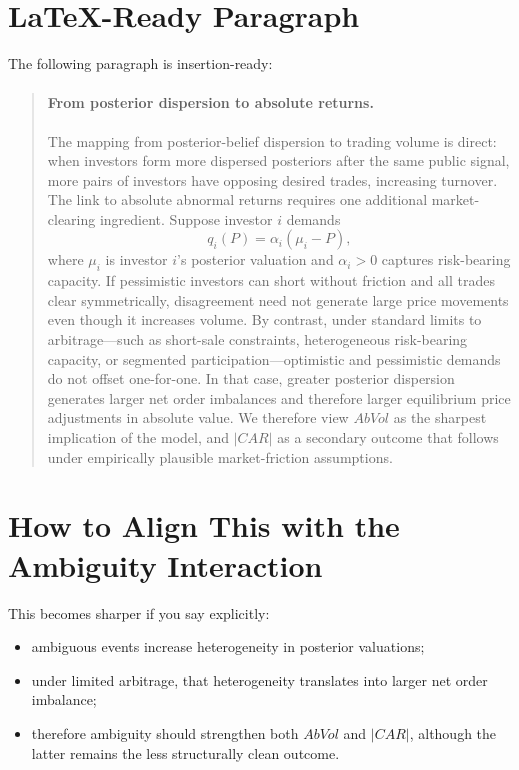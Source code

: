 \documentclass[11pt]{article}
\begin{document}
\section*{LaTeX-Ready Paragraph}
The following paragraph is insertion-ready:

\begin{quote}
\paragraph{From posterior dispersion to absolute returns.}
The mapping from posterior-belief dispersion to trading volume is direct: when investors form more dispersed posteriors after the same public signal, more pairs of investors have opposing desired trades, increasing turnover. The link to absolute abnormal returns requires one additional market-clearing ingredient. Suppose investor $i$ demands
\[
q_i(P)=\alpha_i(\mu_i-P),
\]
where $\mu_i$ is investor $i$'s posterior valuation and $\alpha_i>0$ captures risk-bearing capacity. If pessimistic investors can short without friction and all trades clear symmetrically, disagreement need not generate large price movements even though it increases volume. By contrast, under standard limits to arbitrage---such as short-sale constraints, heterogeneous risk-bearing capacity, or segmented participation---optimistic and pessimistic demands do not offset one-for-one. In that case, greater posterior dispersion generates larger net order imbalances and therefore larger equilibrium price adjustments in absolute value. We therefore view $AbVol$ as the sharpest implication of the model, and $|CAR|$ as a secondary outcome that follows under empirically plausible market-friction assumptions.
\end{quote}

\section*{How to Align This with the Ambiguity Interaction}
This becomes sharper if you say explicitly:
\begin{itemize}[leftmargin=1.5em]
    \item ambiguous events increase heterogeneity in posterior valuations;
    \item under limited arbitrage, that heterogeneity translates into larger net order imbalance;
    \item therefore ambiguity should strengthen both $AbVol$ and $|CAR|$, although the latter remains the less structurally clean outcome.
\end{itemize}
\end{document}
